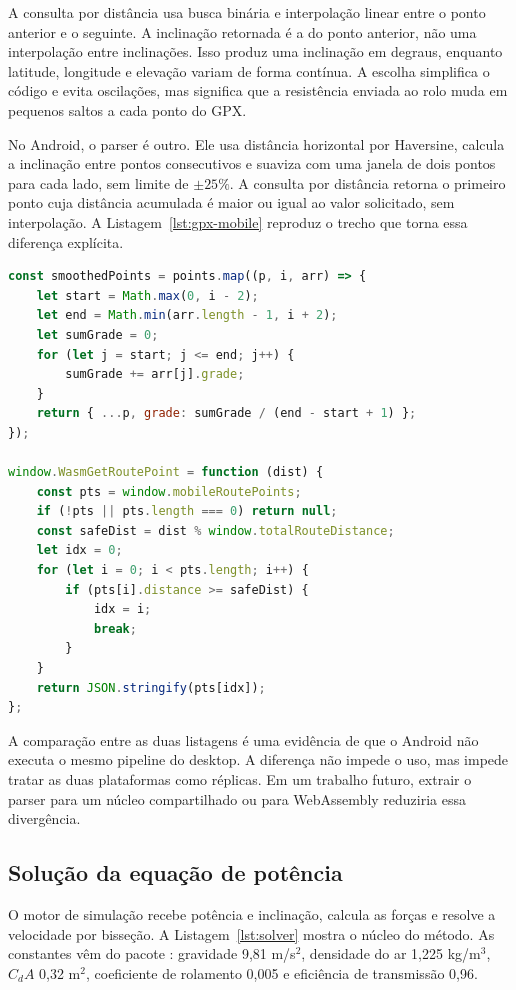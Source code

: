 A consulta por distância usa busca binária e interpolação linear entre o ponto
anterior e o seguinte. A inclinação retornada é a do ponto anterior, não uma
interpolação entre inclinações. Isso produz uma inclinação em degraus, enquanto
latitude, longitude e elevação variam de forma contínua. A escolha simplifica o
código e evita oscilações, mas significa que a resistência enviada ao rolo
muda em pequenos saltos a cada ponto do GPX.

No Android, o parser é outro. Ele usa distância horizontal por Haversine, calcula
a inclinação entre pontos consecutivos e suaviza com uma janela de dois pontos
para cada lado, sem limite de $\pm 25\%$. A consulta por distância retorna o
primeiro ponto cuja distância acumulada é maior ou igual ao valor solicitado,
sem interpolação. A Listagem~\ref{lst:gpx-mobile} reproduz o trecho que torna
essa diferença explícita.

\begin{lstlisting}[language=JavaScript, caption={Suavização e consulta de GPX no Android}, label={lst:gpx-mobile}]
const smoothedPoints = points.map((p, i, arr) => {
    let start = Math.max(0, i - 2);
    let end = Math.min(arr.length - 1, i + 2);
    let sumGrade = 0;
    for (let j = start; j <= end; j++) {
        sumGrade += arr[j].grade;
    }
    return { ...p, grade: sumGrade / (end - start + 1) };
});

window.WasmGetRoutePoint = function (dist) {
    const pts = window.mobileRoutePoints;
    if (!pts || pts.length === 0) return null;
    const safeDist = dist % window.totalRouteDistance;
    let idx = 0;
    for (let i = 0; i < pts.length; i++) {
        if (pts[i].distance >= safeDist) {
            idx = i;
            break;
        }
    }
    return JSON.stringify(pts[idx]);
};
\end{lstlisting}

A comparação entre as duas listagens é uma evidência de que o Android não
executa o mesmo pipeline do desktop. A diferença não impede o uso, mas impede
tratar as duas plataformas como réplicas. Em um trabalho futuro, extrair o
parser para um núcleo compartilhado ou para WebAssembly reduziria essa
divergência.

\subsection{Solução da equação de potência}
\label{sec:implementacao-solver}

O motor de simulação recebe potência e inclinação, calcula as forças e resolve
a velocidade por bisseção. A Listagem~\ref{lst:solver} mostra o núcleo do
método. As constantes vêm do pacote : gravidade 9,81 m/s$^2$,
densidade do ar 1,225 kg/m$^3$, $C_dA$ 0,32 m$^2$, coeficiente de rolamento
0,005 e eficiência de transmissão 0,96.

